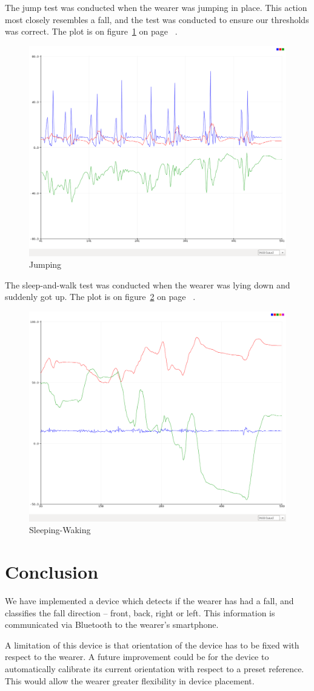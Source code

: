 \documentclass[11pt, a4paper]{article}
\begin{document}
\noindent The jump test was conducted when the wearer was jumping in place. This action most closely resembles a fall, and the test was conducted to ensure our thresholds was correct. The plot is on figure~\ref{fig:jumping} on page ~\pageref{fig:jumping}.
\begin{figure}
    \centering
    \includegraphics[width=0.70\linewidth]{jump.png}
    \caption{Jumping}
    \label{fig:jumping}
\end{figure}

\noindent The sleep-and-walk test was conducted when the wearer was lying down and suddenly
got up. The plot is on figure~\ref{fig:sleeping} on page ~\pageref{fig:sleeping}.
\begin{figure}
    \centering
    \includegraphics[width=0.7\linewidth]{sleep.png}
    \caption{Sleeping-Waking}
    \label{fig:sleeping}
\end{figure}

\section{Conclusion}
We have implemented a device which detects if the wearer has had a fall, and
classifies the fall direction -- front, back, right or left. This information
is communicated via Bluetooth to the wearer's smartphone.

\noindent A limitation of this device is that orientation of the device has
to be fixed with respect to the wearer.  A future improvement could be for the
device to automatically calibrate its current orientation with respect to a
preset reference. This would allow the wearer greater flexibility in device
placement.



\end{document}
